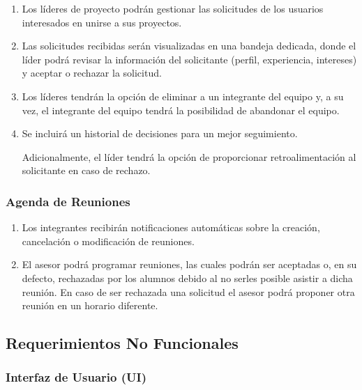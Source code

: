 	\begin{enumerate}
		\item Los líderes de proyecto podrán gestionar las solicitudes de los usuarios
			interesados en unirse a sus proyectos.

		\item Las solicitudes recibidas serán visualizadas en una bandeja dedicada,
			donde el líder podrá revisar la información del solicitante (perfil,
			experiencia, intereses) y aceptar o rechazar la solicitud.

		\item Los líderes tendrán la opción de eliminar a un integrante del equipo y,
			a su vez, el integrante del equipo tendrá la posibilidad de abandonar el equipo.

		\item Se incluirá un historial de decisiones para un mejor seguimiento.

			Adicionalmente, el líder tendrá la opción de proporcionar
			retroalimentación al solicitante en caso de rechazo.
	\end{enumerate}

	\subsubsection{Agenda de Reuniones}

	\begin{enumerate}
		\item Los integrantes recibirán notificaciones automáticas sobre la creación,
			cancelación o modificación de reuniones.

		\item El asesor podrá programar reuniones, las cuales podrán ser aceptadas o,
			en su defecto, rechazadas por los alumnos debido al no serles posible
			asistir a dicha reunión. En caso de ser rechazada una solicitud el asesor podrá
			proponer otra reunión en un horario diferente.
	\end{enumerate}

	\subsection{Requerimientos No Funcionales}

	\subsubsection{Interfaz de Usuario (UI)}

